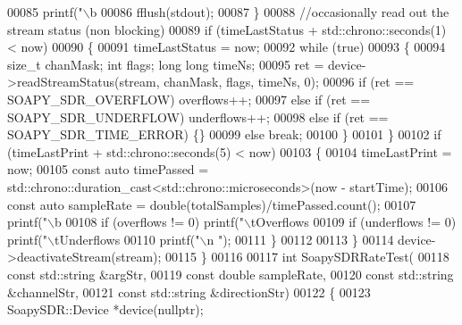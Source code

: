 \begin{DoxyCode}
00085             printf(\textcolor{stringliteral}{"\(\backslash\)b%
00086             fflush(stdout);
00087         \}
00088         \textcolor{comment}{//occasionally read out the stream status (non blocking)}
00089         \textcolor{keywordflow}{if} (timeLastStatus + std::chrono::seconds(1) < now)
00090         \{
00091             timeLastStatus = now;
00092             \textcolor{keywordflow}{while} (\textcolor{keyword}{true})
00093             \{
00094                 \textcolor{keywordtype}{size\_t} chanMask; \textcolor{keywordtype}{int} flags; \textcolor{keywordtype}{long} \textcolor{keywordtype}{long} timeNs;
00095                 ret = device->readStreamStatus(stream, chanMask, flags, timeNs, 0);
00096                 \textcolor{keywordflow}{if} (ret == SOAPY_SDR_OVERFLOW) overflows++;
00097                 \textcolor{keywordflow}{else} \textcolor{keywordflow}{if} (ret == SOAPY_SDR_UNDERFLOW) underflows++;
00098                 \textcolor{keywordflow}{else} \textcolor{keywordflow}{if} (ret == SOAPY_SDR_TIME_ERROR) \{\}
00099                 \textcolor{keywordflow}{else} \textcolor{keywordflow}{break};
00100             \}
00101         \}
00102         \textcolor{keywordflow}{if} (timeLastPrint + std::chrono::seconds(5) < now)
00103         \{
00104             timeLastPrint = now;
00105             \textcolor{keyword}{const} \textcolor{keyword}{auto} timePassed = std::chrono::duration\_cast<std::chrono::microseconds>(now - startTime);
00106             \textcolor{keyword}{const} \textcolor{keyword}{auto} sampleRate = double(totalSamples)/timePassed.count();
00107             printf(\textcolor{stringliteral}{"\(\backslash\)b%
00108             \textcolor{keywordflow}{if} (overflows != 0) printf(\textcolor{stringliteral}{"\(\backslash\)tOverflows %
00109             \textcolor{keywordflow}{if} (underflows != 0) printf(\textcolor{stringliteral}{"\(\backslash\)tUnderflows %
00110             printf(\textcolor{stringliteral}{"\(\backslash\)n "});
00111         \}
00112 
00113     \}
00114     device->deactivateStream(stream);
00115 \}
00116 
00117 \textcolor{keywordtype}{int} SoapySDRRateTest(
00118     \textcolor{keyword}{const} std::string &argStr,
00119     \textcolor{keyword}{const} \textcolor{keywordtype}{double} sampleRate,
00120     \textcolor{keyword}{const} std::string &channelStr,
00121     \textcolor{keyword}{const} std::string &directionStr)
00122 \{
00123     SoapySDR::Device *device(\textcolor{keyword}{nullptr});
}}}}
\end{DoxyCode}
